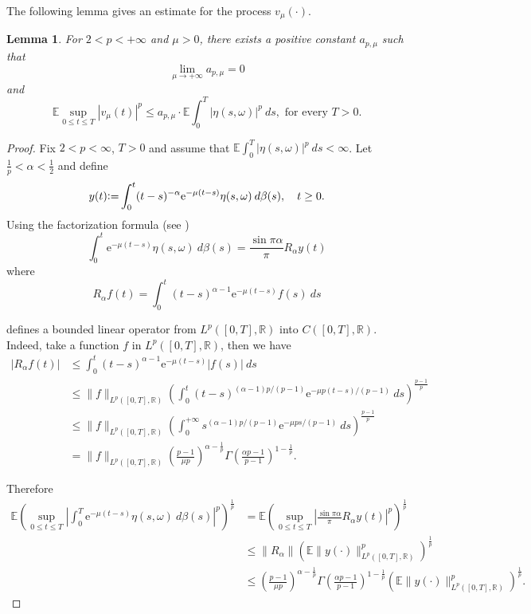 \documentclass[11pt,reqno,draft]{amsart}
\newtheorem{lemma}[defi]{Lemma}
\begin{document}
\noindent The following lemma gives an estimate for the process
$v_{\mu}(\cdot)$.
\begin{lemma}\label{stoch-fact}
For $2<p<+\infty$ and $\mu>0$, there exists a positive
constant $a_{p,\mu}$ such that
$$\lim\limits_{\mu\to +\infty}a_{p,\mu}= 0$$ and
\begin{equation}\label{estimate}
{\mathbb E}\sup\limits_{0\leq t\leq T}|v_{\mu}(t)|^p\leq a_{p,\mu}\cdot
{\mathbb E}\int_0^T|\eta(s,\omega)|^p\:ds , \mbox{ for every }T>0.
\end{equation}
\end{lemma}
\begin{proof}
Fix $2<p<\infty$, $T>0$ and assume that ${\mathbb E} \int_0^T|\eta(s,\omega)|^p\:ds < \infty$.
Let $\frac 1p <\alpha<\frac 12$ and define
$$
y(t){\mathrel{\mathrm{\raise0.1ex\hbox{:}\hbox{=}\strut}}}
\int_0^t(t-s)^{-\alpha}{\mathrm{e}}^{-\mu(t-s)}\eta(s,\omega)\:d\beta(s), \quad
t\ge 0.
$$
Using the factorization formula (see \cite[Sect. 7.1]{DPZ1})
$$
\int_0^t
{\mathrm{e}}^{-\mu(t-s)}\eta(s,\omega)\:d\beta(s)=\frac{\sin\pi\alpha}{\pi}R_{\alpha}y(t)
$$
where
$$
R_{\alpha}f(t)=\int_0^t(t-s)^{\alpha-1}{\mathrm{e}}^{-\mu(t-s)}f(s)\:ds
$$

\noindent defines a bounded linear operator from $L^p([0,T],{\mathbb R})$
into $C([0,T],{\mathbb R})$. Indeed, take a function $f$ in $ L^p([0,T],{\mathbb R})$,
then we have
\begin{equation*}
\begin{split}
|R_{\alpha}f(t)|&\leq
\int_0^t(t-s)^{\alpha-1}{\mathrm{e}}^{-\mu(t-s)}|f(s)|\:ds\\
&\leq \|f\|_{L^p([0,T],{\mathbb R})}\left(
\int_0^t(t-s)^{(\alpha-1)p/(p-1)}{\mathrm{e}}^{-\mu
p(t-s)/(p-1)}\:ds\right)^{\frac{p-1}{p}}\\
&\leq \|f\|_{L^p([0,T],{\mathbb R})}\left(
\int_0^{+\infty}s^{(\alpha-1)p/(p-1)}{\mathrm{e}}^{-\mu
ps/(p-1)}\:ds\right)^{\frac{p-1}{p}}\\
&=\|f\|_{L^p([0,T],{\mathbb R})}\left(\frac{p-1}{\mu p}\right)^{\alpha-\frac
1p}\Gamma \left( \frac{\alpha p-1}{p-1}\right)^{1-\frac 1p}.
\end{split}
\end{equation*}

\noindent Therefore
\begin{equation*}
\begin{split}
{\mathbb E}\left(\sup\limits_{0\leq t\leq
T}\left|\int_0^T{\mathrm{e}}^{-\mu(t-s)}\eta(s,\omega)\:d\beta(s)\right|^p\right)^{\frac
1p}&={\mathbb E}\left(\sup\limits_{0\leq t\leq
T}\left|\frac{\sin\pi\alpha}{\pi}R_{\alpha}y(t)\right|^p\right)^{\frac 1p}\\
&\leq
\|R_{\alpha}\|\left({\mathbb E}\|y(\cdot)\|_{L^p([0,T],{\mathbb R})}^p\right)^{\frac
1p}\\ &\leq \left(\frac{p-1}{\mu p}\right)^{\alpha-\frac 1p}\Gamma
\left( \frac{\alpha p-1}{p-1}\right)^{1-\frac 1p}
\left({\mathbb E}\|y(\cdot)\|_{L^p([0,T],{\mathbb R})}^p\right)^{\frac 1p}.
\end{split}
\end{equation*}


\end{proof}
\end{document}
